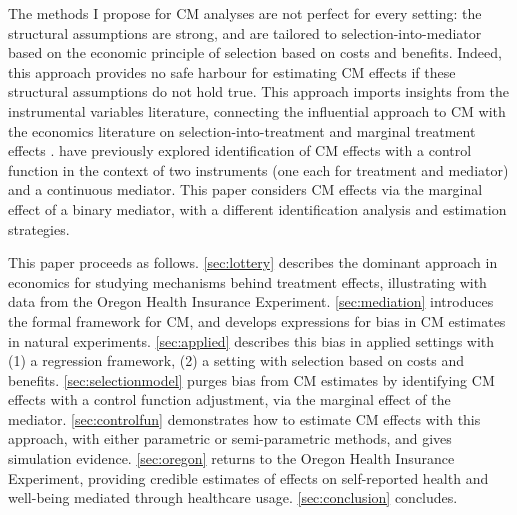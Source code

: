 The methods I propose for CM analyses are not perfect for every setting: the structural assumptions are strong, and are tailored to selection-into-mediator based on the economic principle of selection based on costs and benefits.
Indeed, this approach provides no safe harbour for estimating CM effects if these structural assumptions do not hold true.
This approach imports insights from the instrumental variables literature, connecting the influential \cite{imai2010identification} approach to CM with the economics literature on selection-into-treatment and marginal treatment effects \citep{vytlacil2002independence,heckman2004using,heckman2005structural,florens2008identification,kline2019heckits}.
\cite{frolich2017direct} have previously explored identification of CM effects with a control function in the context of two instruments (one each for treatment and mediator) and a continuous mediator.
This paper considers CM effects via the marginal effect of a binary mediator, with a different identification analysis and estimation strategies.

This paper proceeds as follows.
\autoref{sec:lottery} describes the dominant approach in economics for studying mechanisms behind treatment effects, illustrating with data from the Oregon Health Insurance Experiment.
\autoref{sec:mediation} introduces the formal framework for CM, and develops expressions for bias in CM estimates in natural experiments.
\autoref{sec:applied} describes this bias in applied settings with (1) a regression framework, (2) a setting with selection based on costs and benefits.
\autoref{sec:selectionmodel} purges bias from CM estimates by identifying CM effects with a control function adjustment, via the marginal effect of the mediator.
\autoref{sec:controlfun} demonstrates how to estimate CM effects with this approach, with either parametric or semi-parametric methods, and gives simulation evidence.
\autoref{sec:oregon} returns to the Oregon Health Insurance Experiment, providing credible estimates of effects on self-reported health and well-being mediated through healthcare usage.
\autoref{sec:conclusion} concludes.
